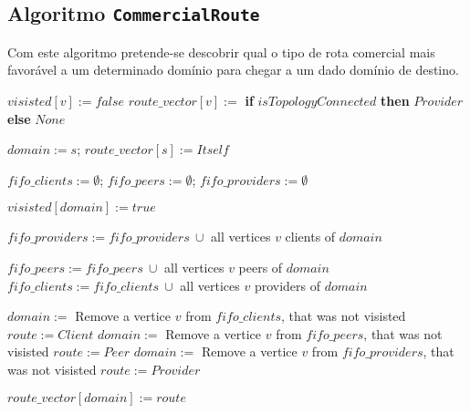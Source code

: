 \documentclass{article}
\begin{document}

\setcounter{page}{1}

\subsection{Algoritmo \texttt{CommercialRoute}}

Com este algoritmo pretende-se descobrir qual o tipo de rota comercial mais favorável a um determinado domínio para chegar a um dado domínio de destino.

\begin{algorithm}[H]
\caption{}
\label{al:generatecode}
\begin{algorithmic}
		\State $visisted[v] := false$
		\State $route\_vector[v] :=$ \textbf{if} $isTopologyConnected$ \textbf{then} $Provider$ \textbf{else} $None$

	\EndFor
	
	\State $domain := s$; $route\_vector[s] := Itself$
	
	\State $fifo\_clients := \emptyset$; 
	$fifo\_peers := \emptyset$;
	$fifo\_providers := \emptyset$
	
	\State
	
		\State $visisted[domain] := true$
		
			\State $fifo\_providers := fifo\_providers \ \cup$ all vertices $v$ clients of $domain$
		\EndIf
						
			\State $fifo\_peers := fifo\_peers \ \cup$ all vertices $v$ peers of $domain$			
			\State $fifo\_clients := fifo\_clients \ \cup$ all vertices $v$ providers of $domain$		
		\EndIf
		
		
		\State $domain :=$ Remove a vertice $v$ from $fifo\_clients$, that was not visisted
		\State $route := Client$
			\State $domain :=$ Remove a vertice $v$ from $fifo\_peers$, that was not visisted
			\State $route := Peer$
				\State $domain :=$ Remove a vertice $v$ from $fifo\_providers$, that was not visisted
				\State $route := Provider$
			\EndIf
		\EndIf
		
		\State $route\_vector[domain] := route$
	\EndWhile
\EndFunction
\end{algorithmic}
\end{algorithm}
\end{document}
